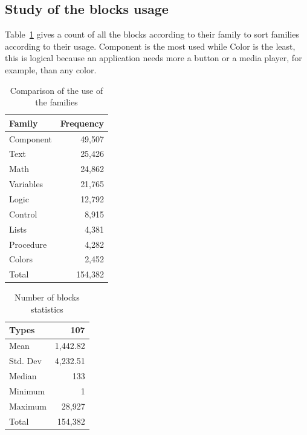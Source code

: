 \documentclass[a4paper]{article}
\begin{document}
\subsection{Study of the blocks usage}
Table~\ref{tab:block-fam-comp} gives a count of all the blocks according to their family to sort families according to their usage. Component is the most used while Color is the least, this is logical because an application needs more a button or a media player, for example, than any color.

\begin{table}
\begin{center}
\caption{Comparison of the use of the families}
\bigskip
\label{tab:block-fam-comp}
\begin{tabular}{|l|r|}
\hline
\textbf{Family} & \textbf{Frequency} \\ \hline
Component & 49,507 \\ \hline
Text	& 25,426\\ \hline
Math & 24,862\\ \hline
Variables & 21,765\\ \hline
Logic & 12,792\\ \hline
Control & 8,915\\ \hline
Lists & 4,381\\ \hline
Procedure & 4,282\\ \hline
Colors & 2,452\\ \hline
Total & 154,382\\ \hline
\end{tabular}
\end{center}
\end{table}

\begin{table}[ht]
\begin{center}
\caption{Number of blocks statistics}
\bigskip
\label{tab:number-blocks}
\begin{tabular}{|l|r|}
\hline
Types & 107\\ \hline
Mean & 1,442.82\\ \hline
Std. Dev & 4,232.51\\ \hline
Median & 133\\ \hline
Minimum & 1\\ \hline
Maximum & 28,927\\ \hline
Total & 154,382\\ \hline
\end{tabular}
\end{center}
\end{table}
\end{document}

